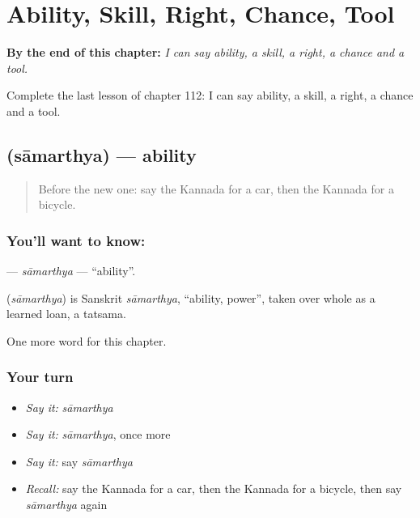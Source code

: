 
\chapter{Ability, Skill, Right, Chance, Tool}
\label{ch:ka-ability-skill-right-chance-tool}

\begin{chapteropening}
\textbf{By the end of this chapter:} \emph{I can say ability, a skill, a right, a chance and a tool.}

Complete the last lesson of chapter 112: I can say ability, a skill, a right, a chance and a tool.
\end{chapteropening}

\section[\texorpdfstring{\kn{ಸಾಮರ್ಥ್ಯ} (sāmarthya)}{ಸಾಮರ್ಥ್ಯ (sāmarthya)}]{ (sāmarthya) — ability}

\label{lesson:KA-C112-samarthya}



\begin{quote}
Before the new one: say the Kannada for a car, then the Kannada for a bicycle.
\end{quote}

\subsection*{You'll want to know: }
\textbf{} — \emph{sāmarthya} — \textquotedblleft{}ability\textquotedblright{}.

\begin{cousinweb}
\textbf{} (\emph{sāmarthya}) is Sanskrit \emph{sāmarthya}, \textquotedblleft{}ability, power\textquotedblright{}, taken over whole as a learned loan, a tatsama.
\end{cousinweb}

\begin{grammarlens}[title={What you've built}]
One more word for this chapter.
\end{grammarlens}

\subsection*{Your turn}
\begin{itemize}
\raggedright
  \item \emph{Say it:} \emph{sāmarthya}
  \item \emph{Say it:} \emph{sāmarthya}, once more
  \item \emph{Say it:} say \emph{sāmarthya}
  \item \emph{Recall:} say the Kannada for a car, then the Kannada for a bicycle, then say \emph{sāmarthya} again
\end{itemize}

